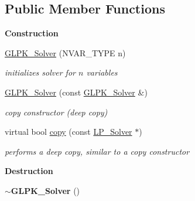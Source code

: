 \subsection*{Public Member Functions}
\begin{Indent}\textbf{ Construction}\par
\begin{DoxyCompactItemize}
\item 
\mbox{\label{class_g_l_p_k___solver_a290ed6f0f6be3c6edf5ec5b5f5bfbb3a}} 
\hyperlink{class_g_l_p_k___solver_a290ed6f0f6be3c6edf5ec5b5f5bfbb3a}{G\+L\+P\+K\+\_\+\+Solver} (N\+V\+A\+R\+\_\+\+T\+Y\+PE n)
\begin{DoxyCompactList}\small\item\em initializes solver for $ n $ variables \end{DoxyCompactList}\item 
\mbox{\label{class_g_l_p_k___solver_a6cbd7db2555c39cb789fa45a8ad22f8f}} 
\hyperlink{class_g_l_p_k___solver_a6cbd7db2555c39cb789fa45a8ad22f8f}{G\+L\+P\+K\+\_\+\+Solver} (const \hyperlink{class_g_l_p_k___solver}{G\+L\+P\+K\+\_\+\+Solver} \&)
\begin{DoxyCompactList}\small\item\em copy constructor (deep copy) \end{DoxyCompactList}\item 
virtual bool \hyperlink{class_g_l_p_k___solver_aff3a58ef3def363dfad9e0ba8eee3e67}{copy} (const \hyperlink{class_l_p___solver}{L\+P\+\_\+\+Solver} $\ast$)
\begin{DoxyCompactList}\small\item\em performs a deep copy, similar to a copy constructor \end{DoxyCompactList}\end{DoxyCompactItemize}
\end{Indent}
\begin{Indent}\textbf{ Destruction}\par
\begin{DoxyCompactItemize}
\item 
\mbox{\label{class_g_l_p_k___solver_a4a4505a58f6d0f93a1c003797b39e468}} 
{\bfseries $\sim$\+G\+L\+P\+K\+\_\+\+Solver} ()
\end{DoxyCompactItemize}
\end{Indent}
